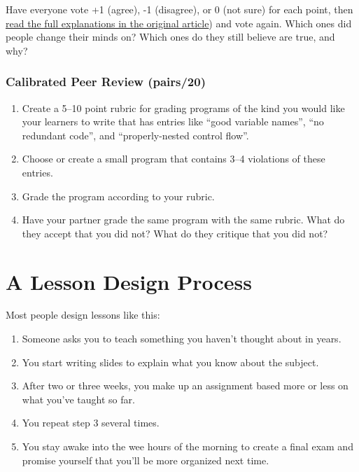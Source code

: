 Have everyone vote +1 (agree), -1 (disagree), or 0 (not sure) for each
point, then \href{https://cacm.acm.org/blogs/blog-cacm/189498-top-10-myths-about-teaching-computer-science/fulltext}{read the full explanations in the original
article}) and vote again. Which ones did people change
their minds on? Which ones do they still believe are true, and why?

\subsection{Calibrated Peer Review (pairs/20)}\label{calibrated-peer-review-pairs20}

\begin{enumerate}
\item
  Create a 5--10 point rubric for grading programs of the kind you
  would like your learners to write that has entries like ``good
  variable names'', ``no redundant code'', and ``properly-nested control
  flow''.
\item
  Choose or create a small program that contains 3--4 violations of
  these entries.
\item
  Grade the program according to your rubric.
\item
  Have your partner grade the same program with the same rubric. What
  do they accept that you did not? What do they critique that you did
  not?
\end{enumerate}

\chapter{A Lesson Design Process}\label{s:process}

Most people design lessons like this:

\begin{enumerate}
\item
  Someone asks you to teach something you haven't thought about in
  years.
\item
  You start writing slides to explain what you know about the subject.
\item
  After two or three weeks, you make up an assignment based more or
  less on what you've taught so far.
\item
  You repeat step 3 several times.
\item
  You stay awake into the wee hours of the morning to create a final
  exam and promise yourself that you'll be more organized next time.
\end{enumerate}

